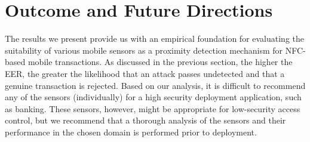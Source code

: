 \documentclass{article}
\begin{document}
\begin{table}[t]
	\centering
	\caption{Usability and Reliability Analysis}
	\label{tab:UsabilityandReliability}
\end{table}

\section{Outcome and Future Directions}
\label{AntiRelayMechanismandAmbientSensorsTheVerdict}

The results we present provide us with an empirical foundation for evaluating the suitability of various mobile sensors as a proximity detection mechanism for NFC-based mobile transactions.  As discussed in the previous section, the higher the EER, the greater the likelihood that an attack passes undetected and that a genuine transaction is rejected.  Based on our analysis, it is difficult to recommend any of the sensors (individually) for a high security deployment application, such as banking.  These sensors, however, might be appropriate for low-security access control, but we recommend that a thorough analysis of the sensors and their performance in the chosen domain is performed prior to deployment.
\end{document}
